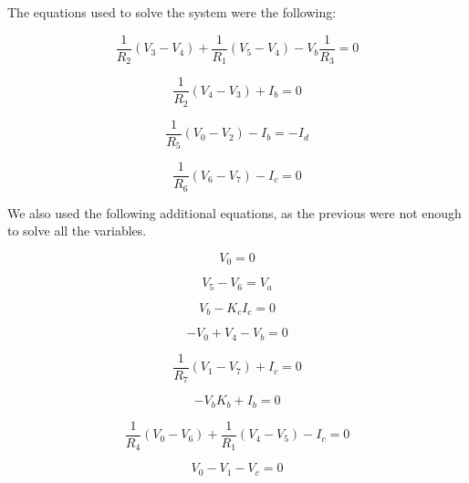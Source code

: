 The equations used to solve the system were the following:

\begin{equation}
  \frac{1}{R_2} (V_3-V_4) + \frac{1}{R_1} (V_5-V_4) - V_b \frac{1}{R_3} = 0
  \label{eq6}
\end{equation}

\begin{equation}
  \frac{1}{R_2} (V_4-V_3) + I_b = 0
  \label{eq7}
\end{equation}

\begin{equation}
  \frac{1}{R_5} (V_0-V_2) - I_b = -I_d
  \label{eq8}
\end{equation}

\begin{equation}
  \frac{1}{R_6} (V_6-V_7) - I_c = 0
  \label{eq9}
\end{equation}

We also used the following additional equations, as the previous were not enough to solve all the variables.

\begin{equation}
  V_0 = 0
  \label{eq10}
\end{equation}

\begin{equation}
  V_5 - V_6 = V_a
  \label{eq11}
\end{equation}

\begin{equation}
  V_b - K_c I_c = 0
  \label{eq12}
\end{equation}

\begin{equation}
  -V_0 + V_4 - V_b = 0
  \label{eq13}
\end{equation}

\begin{equation}
  \frac{1}{R_7} (V_1-V_7) + I_c = 0
  \label{eq14}
\end{equation}

\begin{equation}
  -V_b K_b + I_b = 0
  \label{eq15}
\end{equation}

\begin{equation}
  \frac{1}{R_4} (V_0-V_6) + \frac{1}{R_1} (V_4-V_5) - I_c = 0
  \label{eq16}
\end{equation}

\begin{equation}
  V_0 - V_1 - V_c = 0
  \label{eq17}
\end{equation}

